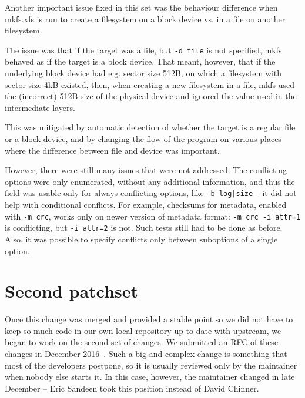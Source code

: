 Another important issue fixed in this set was the behaviour difference when
mkfs.xfs is run to create a filesystem on a block device vs. in a file on
another filesystem.

The issue was that if the target was a file, but {\tt -d file} is not
specified, mkfs behaved as if the target is a block device. That
meant, however, that if the underlying block device had e.g. sector size
512B, on which a filesystem with sector size 4kB existed, then, when
creating a new filesystem in a file, mkfs used the (incorrect) 512B size of
the physical device and ignored the value used in the intermediate layers.


This was mitigated by automatic detection of whether the target is a
regular file or a block device, and by changing the flow of the program on
various places where the difference between file and device was important.

However, there were still many issues that were not addressed. The
conflicting options were only enumerated, without any additional
information, and thus the field was usable only for always conflicting
options, like {\tt -b log|size} -- it did not help with conditional conflicts.
For example, checksums for metadata, enabled with {\tt -m crc}, works only
on newer version of metadata format: {\tt -m crc -i attr=1} is conflicting,
but {\tt -i attr=2} is not. Such tests still had to be done as before.
Also, it was possible to specify conflicts only between suboptions of a
single option.


\section{Second patchset}\label{chap:refactoring:second}

Once this change was merged and provided a stable point so we did not have to
keep so much code in our own local repository up to date with upstream, we
began to work on the second set of changes. We submitted an
RFC of these
changes in December 2016~\cite{secondSetRFC}. Such a big and complex
change is something that most of the developers postpone, so it is
usually reviewed only by the maintainer when nobody else starts it. In this
case, however, the maintainer changed in late December -- Eric Sandeen took
this position instead of David Chinner.

